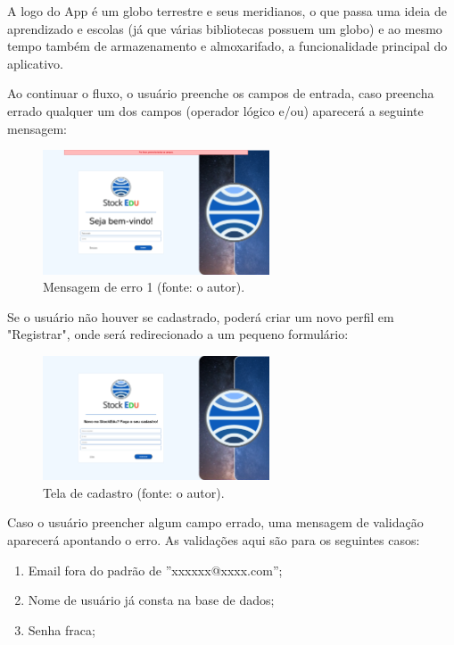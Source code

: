\documentclass[
	12pt,				%
	openright,			%
	twoside,			%
	a4paper,			%
	english,			%
	french,				%
	spanish,			%
	brazil				%
	]{abntex2}
\begin{document}
\begin{table}
\end{table}

A logo do App é um globo terrestre e seus meridianos, o que passa uma ideia de aprendizado e escolas (já que várias bibliotecas possuem um globo) e ao mesmo tempo também de armazenamento e almoxarifado, a funcionalidade principal do aplicativo.

Ao continuar o fluxo, o usuário preenche os campos de entrada, caso preencha errado qualquer um dos campos (operador lógico e/ou) aparecerá a seguinte mensagem:

\begin{figure}[htb]
	\centering
	\includegraphics[width=0.6\textwidth]{fig/print2-errologin.png}
	\caption{Mensagem de erro 1 (fonte: o autor).}
	\label{fig:print2-errologin}
\end{figure}

Se o usuário não houver se cadastrado, poderá criar um novo perfil em "Registrar", onde será redirecionado a um pequeno formulário:

\begin{figure}[htb]
	\centering
	\includegraphics[width=0.6\textwidth]{fig/print3-cadastro.png}
	\caption{Tela de cadastro (fonte: o autor).}
	\label{fig:print3-cadastro}
\end{figure}

Caso o usuário preencher algum campo errado, uma mensagem de validação aparecerá apontando o erro. As validações aqui são para os seguintes casos:

\begin{enumerate}[label=\textbf{\Alph*)}]
	\item Email fora do padrão de ''xxxxxx@xxxx.com'';
	\item Nome de usuário já consta na base de dados;
	\item Senha fraca;
\end{enumerate}
\end{document}
